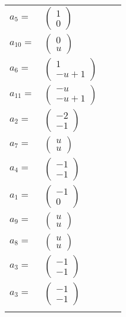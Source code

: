 \documentclass[1p]{elsarticle_modified}
\theoremstyle{definition}
\begin{document}
\begin{tabular}{m{7pt} m{180pt} m{7pt} m{180pt} }
\flushright $a_{5}=$&$\begin{pmatrix}1\\0\end{pmatrix}$ \\
\flushright $a_{10}=$&$\begin{pmatrix}0\\u\end{pmatrix}$ \\
\flushright $a_{6}=$&$\begin{pmatrix}1\\- u+1\end{pmatrix}$ \\
\flushright $a_{11}=$&$\begin{pmatrix}- u\\- u+1\end{pmatrix}$ \\
\flushright $a_{2}=$&$\begin{pmatrix}-2\\-1\end{pmatrix}$ \\
\flushright $a_{7}=$&$\begin{pmatrix}u\\u\end{pmatrix}$ \\
\flushright $a_{4}=$&$\begin{pmatrix}-1\\-1\end{pmatrix}$ \\
\flushright $a_{1}=$&$\begin{pmatrix}-1\\0\end{pmatrix}$ \\
\flushright $a_{9}=$&$\begin{pmatrix}u\\u\end{pmatrix}$ \\
\flushright $a_{8}=$&$\begin{pmatrix}u\\u\end{pmatrix}$ \\
\flushright $a_{3}=$&$\begin{pmatrix}-1\\-1\end{pmatrix}$\\ \flushright $a_{3}=$&$\begin{pmatrix}-1\\-1\end{pmatrix}$\\&\end{tabular}
\end{document}

